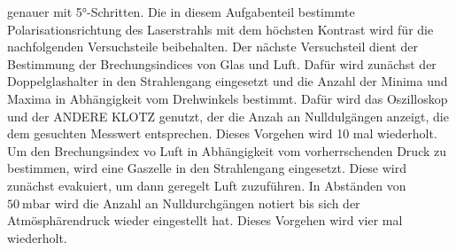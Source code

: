 genauer mit 5°-Schritten. Die in diesem Aufgabenteil bestimmte Polarisationsrichtung des Laserstrahls 
mit dem höchsten Kontrast wird für die nachfolgenden Versuchsteile beibehalten. 
Der nächste Versuchsteil dient der Bestimmung der Brechungsindices von Glas und Luft. 
Dafür wird zunächst der Doppelglashalter in den Strahlengang eingesetzt und die Anzahl der Minima und 
Maxima in Abhängigkeit vom Drehwinkels bestimmt. Dafür wird das Oszilloskop und der ANDERE KLOTZ 
genutzt, der die Anzah an Nulldulgängen anzeigt, die dem gesuchten Messwert entsprechen. Dieses
Vorgehen wird 10 mal wiederholt. \\
Um den Brechungsindex vo Luft in Abhängigkeit vom vorherrschenden Druck zu bestimmen, wird eine
Gaszelle in den Strahlengang eingesetzt. Diese wird zunächst evakuiert, um dann geregelt 
Luft zuzuführen. In Abständen von $\SI{50}{\milli\bar}$ wird die Anzahl an Nulldurchgängen notiert 
bis sich der Atmösphärendruck wieder eingestellt hat. Dieses Vorgehen wird vier mal wiederholt.